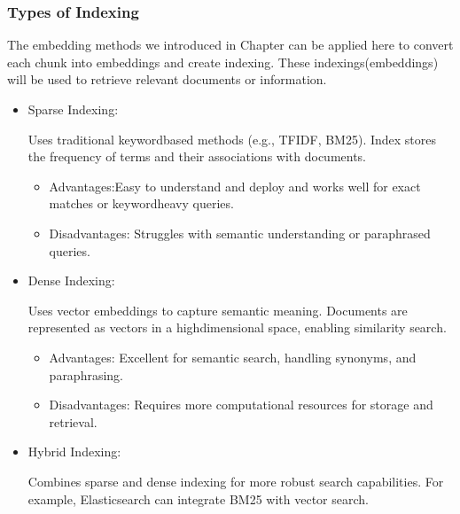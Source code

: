 \documentclass[letterpaper,11pt,english]{sphinxmanual}
\begin{document}
\subsubsection{Types of Indexing}
\label{\detokenize{rag:types-of-indexing}}
\sphinxAtStartPar
The embedding methods we introduced in Chapter {\hyperref[\detokenize{embedding:embedding}]{}} can be applied here to convert each chunk
into embeddings and create indexing. These indexings(embeddings) will be used to retrieve relevant documents or information.
\begin{itemize}
\item {} 
\sphinxAtStartPar
Sparse Indexing:

\sphinxAtStartPar
Uses traditional keyword\sphinxhyphen{}based methods (e.g., TF\sphinxhyphen{}IDF, BM25).
Index stores the frequency of terms and their associations with documents.
\begin{itemize}
\item {} 
\sphinxAtStartPar
Advantages:Easy to understand and deploy and works well for exact matches or keyword\sphinxhyphen{}heavy queries.

\item {} 
\sphinxAtStartPar
Disadvantages: Struggles with semantic understanding or paraphrased queries.

\end{itemize}

\item {} 
\sphinxAtStartPar
Dense Indexing:

\sphinxAtStartPar
Uses vector embeddings to capture semantic meaning. Documents are represented as vectors in a
high\sphinxhyphen{}dimensional space, enabling similarity search.
\begin{itemize}
\item {} 
\sphinxAtStartPar
Advantages: Excellent for semantic search, handling synonyms, and paraphrasing.

\item {} 
\sphinxAtStartPar
Disadvantages: Requires more computational resources for storage and retrieval.

\end{itemize}

\item {} 
\sphinxAtStartPar
Hybrid Indexing:

\sphinxAtStartPar
Combines sparse and dense indexing for more robust search capabilities. For example, Elasticsearch
can integrate BM25 with vector search.

\end{itemize}
\end{document}
